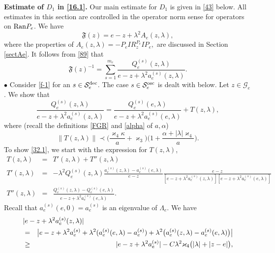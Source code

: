 \documentclass[letterpaper,onecolumn,11pt,accepted=2021-12-09]{quantumarticle}
\numberwithin{equation}{section}
\newcommand{\aes}{a_e^{(s)}}
\newcommand{\Qes}{Q_e^{(s)}}
\begin{document}
\noindent
{\bf Estimate of $D_1$ in \eqref{16.1}. }  Our main estimate for $D_1$ is given in \eqref{43} below. All estimates in this section are controlled in the operator norm sense for operators on ${\rm Ran}P_e$. We have 
\begin{equation}
	{\mathfrak F}(z) = e-z +\lambda^2 A_e(z,\lambda),
	\label{23}
\end{equation}
where the properties of $A_e(z,\lambda)=- P_e I  R_z^{P_e} IP_e,$ are discussed in Section \ref{sectAe}.  It follows from \eqref{89} that 
\begin{equation}
	\label{f-1}
 {\mathfrak F}(z)^{-1} = \sum_{s=1}^{m_e}  \frac{\Qes(z,\lambda)}{e-z+\lambda^2 \aes(z,\lambda)} .
\end{equation}
$\bullet$ Consider \eqref{f-1} for an $s\in{\mathcal S}_e^{\rm dec}$.   The case $s\in{\mathcal S}_e^{\rm osc}$ is dealt with below. Let $z\in{\mathcal G}_e$. We show that 
\begin{equation}
	\frac{\Qes(z,\lambda)}{e-z+\lambda^2 \aes(z,\lambda)} = \frac{\Qes(e,\lambda)}{e-z+\lambda^2 \aes(e,\lambda)}  + T(z,\lambda),
	\label{32.1}
\end{equation}
where (recall the definitions \eqref{FGR}  and \eqref{alpha} of $a, \alpha$)
\begin{equation}
\label{32.2}
\| T(z,\lambda)\| \prec\Big( \frac{\varkappa_4\kappa}{a} +\varkappa_3\Big)  \Big( 1+\frac{\alpha+|\lambda|\varkappa_4}{a}\Big).
\end{equation}
 To show \eqref{32.1}, we start with the expression for $T(z,\lambda)$, 
\begin{eqnarray}
T(z,\lambda) &=& T'(z,\lambda) +T''(z,\lambda)\nonumber\\
T'(z,\lambda) &=& -\lambda^2 \Qes(z,\lambda)  \frac{\aes(z,\lambda)-\aes(e,\lambda)}{e-z} \frac{e-z}{[e-z+\lambda^2 \aes(z,\lambda)][e-z+\lambda^2 \aes(e,\lambda)]}\nonumber\\
T''(z,\lambda) &=& \frac{\Qes(z,\lambda) -\Qes(e,\lambda)}{e-z+\lambda^2 \aes(e,\lambda)}. 
	\label{0032}
\end{eqnarray}
Recall that $\aes(e,0)=\aes$ is an eigenvalue of $\Lambda_e$. We  have
\begin{eqnarray}
	\lefteqn{
|e-z+\lambda^2 \aes(z,\lambda)|}\nonumber\\
 &=& \big|e-z+\lambda^2 \aes +\lambda^2(\aes(e,\lambda)-\aes) +\lambda^2\big(\aes(z,\lambda)-\aes(e,\lambda) \big)\big|\nonumber\\
	&\ge& |e-z+\lambda^2 \aes| -C \lambda^2\varkappa_4 \big(|\lambda|+|z-e|\big),
	\label{032}
\end{eqnarray}
\end{document}
